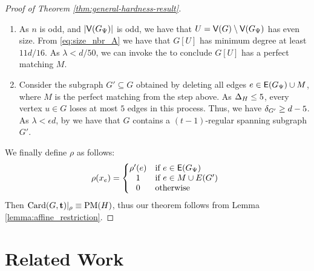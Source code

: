 \documentclass[11pt]{article}
\begin{document}
\begin{proof}[Proof of Theorem \ref{thm:general-hardness-result}]
\begin{enumerate}
\item{ As $n$ is odd, and $|\mathsf{V}(G_{\Psi})|$ is odd, we have that $U = \mathsf{V}(G) \setminus \mathsf{V}(G_{\Psi})$ has even size. From \eqref{eq:size_nbr_A} we have that $G[U]$ has minimum degree at least $11d/16$. As $\lambda < d/50$, we can invoke the  to conclude $G[U]$ has a perfect matching $M$. 
}
  
\item{
  Consider the subgraph $G' \subseteq G$ obtained by deleting all edges $e \in \mathsf{E}(G_{\Psi}) \cup M$, where $M$ is the perfect matching from the step above. As $\Delta_{H} \leq 5$, every vertex $u \in G$ loses at most $5$ edges in this process. Thus, we have $\delta_{G'} \ge d - 5$. As $\lambda < \epsilon d$, by  we have that $G$ contains a $(t-1)$-regular spanning subgraph $G'$. }

\end{enumerate}

We finally define $\rho$ as follows:
\[
\rho(x_e) =
\left\{
\begin{array}{@{}cl}
\rho'(e) & \text{if } e \in \Edges{G_{\EmbeddingFunc}} \\
1 & \text{if } e \in M \cup E(G') \\
0 & \text{otherwise}
\end{array}
\right.
\]
Then $\text{Card}(G, \mathbf{t})|_\rho \equiv \text{PM}(H)$, thus our theorem follows from Lemma \ref{lemma:affine_restriction}.
\end{proof}


\section{Related Work}
\label{sec:related-work}



\clearpage
\appendix
\end{document}
